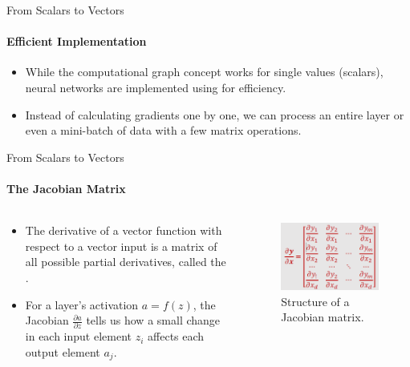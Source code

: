 \begin{frame}{From Scalars to Vectors}
    \framesubtitle{Efficient Implementation}
    \begin{itemize}
        \item While the computational graph concept works for single values (scalars), neural networks are implemented using  for efficiency.
        \item Instead of calculating gradients one by one, we can process an entire layer or even a mini-batch of data with a few matrix operations.
    \end{itemize}
\end{frame}

\begin{frame}{From Scalars to Vectors}
    \framesubtitle{The Jacobian Matrix}
    \begin{columns}[c]
        \begin{column}{0.5\linewidth}
            \begin{itemize}
                \item The derivative of a vector function with respect to a vector input is a matrix of all possible partial derivatives, called the .
                \item For a layer's activation $a = f(z)$, the Jacobian $\frac{\partial a}{\partial z}$ tells us how a small change in each input element $z_i$ affects each output element $a_j$.
            \end{itemize}
        \end{column}
        \begin{column}{0.5\linewidth}
            \begin{figure}
                \centering
                \includegraphics[width=0.8\linewidth]{images/jacobian_matrix.png}
                \caption{Structure of a Jacobian matrix.}
            \end{figure}
        \end{column}
    \end{columns}
\end{frame}

